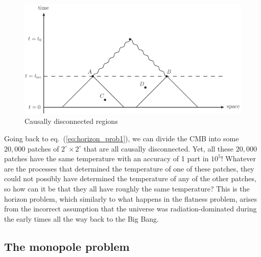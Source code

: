 \documentclass[11pt, a4paper,oneside,openright]{book}
\numberwithin{equation}{section}
\begin{document}
\begin{figure}[ht]
\begin{center}
\includegraphics[scale=0.5]{Draw/lec12_4.png}
\end{center}
\caption{Causally disconnected regions}
\label{fig:lec12_4}
\end{figure}

Going back to eq.\ (\ref{eq:horizon_prob1}), we can divide the CMB into some $20,000$ patches of $2^{\circ}\times2^{\circ}$ that are all causally disconnected. Yet, all these $20,000$ patches have the same temperature with an accuracy of 1 part in $10^5$! Whatever are the processes that determined the temperature of one of these patches, they could not possibly have determined the temperature of any of the other patches, so how can it be that they all have roughly the same temperature? This is the horizon problem, which similarly to what happens in the flatness problem, arises from the incorrect assumption that the universe was radiation-dominated during the early times all the way back to the Big Bang.

\subsection{The monopole problem}
\end{document}
